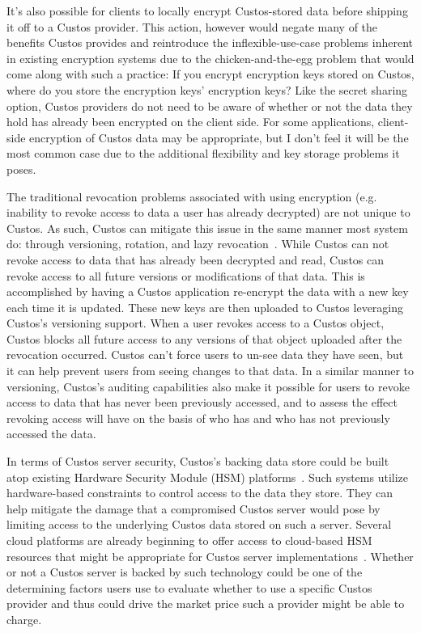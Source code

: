 It's also possible for clients to locally encrypt Custos-stored data
before shipping it off to a Custos provider. This action, however
would negate many of the benefits Custos provides and reintroduce the
inflexible-use-case problems inherent in existing encryption systems
due to the chicken-and-the-egg problem that would come along with such
a practice: If you encrypt encryption keys stored on Custos, where do
you store the encryption keys' encryption keys? Like the secret
sharing option, Custos providers do not need to be aware of whether or
not the data they hold has already been encrypted on the client
side. For some applications, client-side encryption of Custos data may
be appropriate, but I don't feel it will be the most common case due
to the additional flexibility and key storage problems it poses.

The traditional revocation problems associated with using encryption
(e.g. inability to revoke access to data a user has already decrypted)
are not unique to Custos. As such, Custos can mitigate this issue in
the same manner most system do: through versioning, rotation, and lazy
revocation~\cite{Kallahalla2003}. While Custos can not revoke access
to data that has already been decrypted and read, Custos can revoke
access to all future versions or modifications of that data. This is
accomplished by having a Custos application re-encrypt the data with a
new key each time it is updated. These new keys are then uploaded to
Custos leveraging Custos's versioning support. When a user revokes
access to a Custos object, Custos blocks all future access to any
versions of that object uploaded after the revocation occurred. Custos
can't force users to un-see data they have seen, but it can help
prevent users from seeing changes to that data. In a similar manner to
versioning, Custos's auditing capabilities also make it possible for
users to revoke access to data that has never been previously
accessed, and to assess the effect revoking access will have on the
basis of who has and who has not previously accessed the data.

In terms of Custos server security, Custos's backing data store could
be built atop existing Hardware Security Module (HSM)
platforms~\cite{fips140}. Such systems utilize hardware-based
constraints to control access to the data they store. They can help
mitigate the damage that a compromised Custos server would pose by
limiting access to the underlying Custos data stored on such a
server. Several cloud platforms are already beginning to offer access
to cloud-based HSM resources that might be appropriate for Custos
server implementations~\cite{amazon-hsm}. Whether or not a Custos
server is backed by such technology could be one of the determining
factors users use to evaluate whether to use a specific Custos
provider and thus could drive the market price such a provider might
be able to charge.

